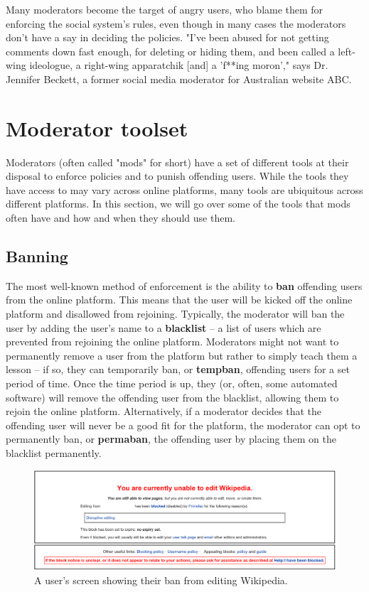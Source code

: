 \documentclass[class=book, crop=false]{standalone}
\providecommand{\keyterm}[1]{\textbf{#1}\marginnote{\scriptsize \textbf{#1}}}
\begin{document}
Many moderators become the target of angry users, who blame them for enforcing the social system's rules, even though in many cases the moderators don't have a say in deciding the policies. "I've been abused for not getting comments down fast enough, for deleting or hiding them, and been called a left-wing ideologue, a right-wing apparatchik [and] a 'f**ing moron'," says Dr. Jennifer Beckett, a former social media moderator for Australian website ABC.

\section{Moderator toolset}

Moderators (often called "mods" for short) have a set of different tools at their disposal to enforce policies and to punish offending users. While the tools they have access to may vary across online platforms, many tools are ubiquitous across different platforms. In this section, we will go over some of the tools that mods often have and how and when they should use them.

\subsection{Banning}

The most well-known method of enforcement is the ability to \keyterm{ban} offending users from the online platform. This means that the user will be kicked off the online platform and disallowed from rejoining. Typically, the moderator will ban the user by adding the user's name to a \keyterm{blacklist} -- a list of users which are prevented from rejoining the online platform. Moderators might not want to permanently remove a user from the platform but rather to simply teach them a lesson -- if so, they can temporarily ban, or \keyterm{tempban}, offending users for a set period of time. Once the time period is up, they (or, often, some automated software) will remove the offending user from the blacklist, allowing them to rejoin the online platform. Alternatively, if a moderator decides that the offending user will never be a good fit for the platform, the moderator can opt to permanently ban, or \keyterm{permaban}, the offending user by placing them on the blacklist permanently.

\begin{figure}[!tbp]
  \centering
  \begin{minipage}[b]{0.8\textwidth}
    \includegraphics[width=\textwidth]{Blocknotice-wikipedia}
    \caption{A user's screen showing their ban from editing Wikipedia.}
  \end{minipage}
\end{figure}
\end{document}
